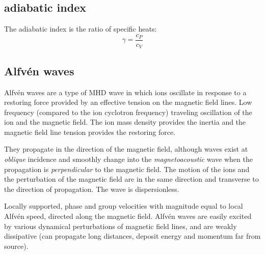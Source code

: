 \documentclass{article}
\begin{document}
\subsection{adiabatic index}
The adiabatic index is the ratio of specific heats:
\[
    \gamma = \frac{c_{P}}{c_{V}}
    \]


\subsection{Alfv\'en waves}
Alfv\'en waves are a type of MHD wave in which ions oscillate in response to a
restoring force provided by an effective tension on the magnetic field lines.
Low frequency (compared to the ion cyclotron frequency) traveling
oscillation of the ion and the magnetic field. The ion mass
density provides the inertia and the magnetic field line
tension provides the restoring force.

They propagate in the direction of the magnetic field, although waves exist
at \emph{oblique} incidence and smoothly change into the \emph{magnetoacoustic}
wave when the propagation is \emph{perpendicular} to the magnetic field.
The motion of the ions and the perturbation of the magnetic
field are in the same direction and transverse to the direction of
propagation. The wave is dispersionless.

Locally supported, phase and group velocities with magnitude equal to
local Alfv\'en speed, directed along the magnetic field.
Alfv\'en waves are easily excited by various dynamical perturbations of
magnetic field lines, and are
weakly dissipative (can propagate long distances, deposit energy
and momentum far from source).
\end{document}
